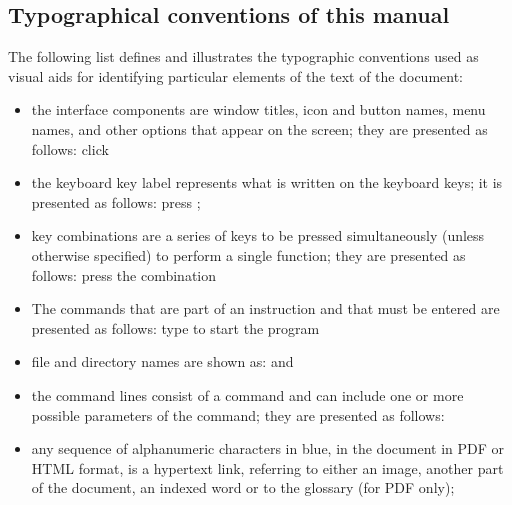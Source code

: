 \subsection{Typographical conventions of this manual \label{introduction-manual-conventions}}

The following list defines and illustrates the typographic conventions used as visual aids for identifying particular elements of the text of the document:

\begin{itemize}
	\item the interface components are window titles, icon and button names, menu names, and other options that appear on the screen; they are presented as follows:
		\newline
		\hspace*{1.5cm} click 
	\item the keyboard key label represents what is written on the keyboard keys; it is presented as follows:
		\newline
		\hspace*{1.5cm} press ;
	\item key combinations are a series of keys to be pressed simultaneously (unless otherwise specified) to perform a single function; they are presented as follows:
		\newline
		\hspace*{1.5cm} press the combination 
	\item The commands that are part of an instruction and that must be entered are presented as follows:
		\newline
		\hspace*{1.5cm} type  to start the program
	\item file and directory names are shown as:
		\newline
		\hspace*{1.5cm}  and 
	\item the command lines consist of a command and can include one or more possible parameters of the command; they are presented as follows:
		\newline
		\hspace*{1.5cm} 
	\item any sequence of alphanumeric characters in blue, in the document in PDF or HTML format, is a hypertext link, referring to either an image, another part of the document, an indexed word or to the glossary (for PDF only);

\end{itemize}
